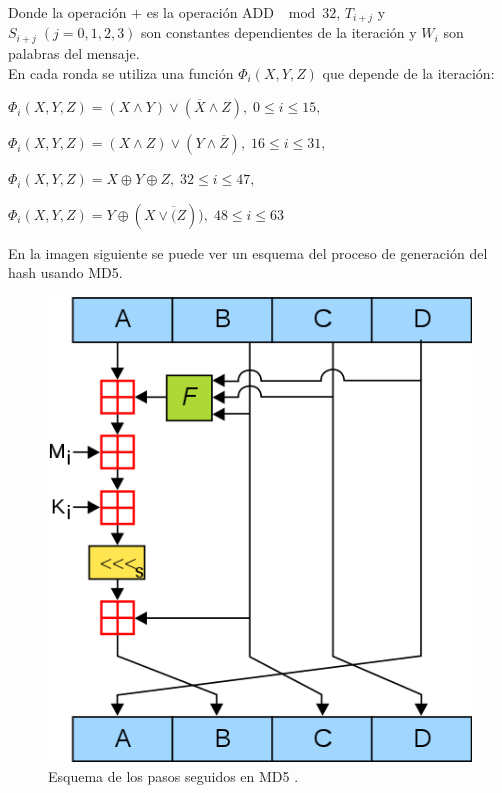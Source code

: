 \begin{aligned*}
\begin{enumerate}
$$	$$
	Donde la operación $+$ es la operación ADD $\mod 32$, $T_{i+j}$ y $S_{i+j}\; (j=0,1,2,3)$ son constantes dependientes de la iteración y $W_i$ son palabras del mensaje.\\
	En cada ronda se utiliza una función $\Phi_i(X,Y,Z)$ que depende de la iteración:
\end{enumerate}
En la imagen siguiente se puede ver un esquema del proceso de generación del hash usando MD5.
\begin{figure}[htb]
	\centering
	\includegraphics[scale=0.5]{imagenes/md5.png} 
	\caption{Esquema de los pasos seguidos en MD5 \cite{fotosmd5}.}
\end{figure}


\end{aligned*}
